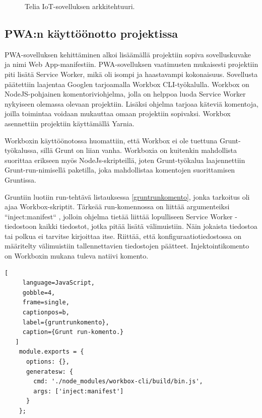 \documentclass{tktltiki}
\begin{document}
\begin{figure}[h]
\begin{center}
\caption{Telia IoT-sovelluksen arkkitehtuuri.}
\label{angulararkkitehtuuri}
\end{center}
\end{figure}


\subsection{PWA:n käyttöönotto projektissa}

PWA-sovelluksen kehittäminen alkoi lisäämällä projektiin sopiva sovelluskuvake ja nimi Web App-manifestiin. PWA-sovelluksen vaatimusten mukaisesti projektiin piti lisätä Service Worker, mikä oli isompi ja haastavampi kokonaisuus. Sovellusta päätettiin laajentaa Googlen tarjoamalla Workbox CLI-työkalulla. Workbox on NodeJS-pohjainen komentoriviohjelma, jolla on helppoa luoda Service Worker nykyiseen olemassa olevaan projektiin. Lisäksi ohjelma tarjoaa käteviä komentoja, joilla toimintaa voidaan mukauttaa omaan projektiin sopivaksi. Workbox asennettiin projektiin käyttämällä Yarnia.

Workboxin käyttöönotossa huomattiin, että Workbox ei ole tuettuna Grunt-työkalussa, sillä Grunt on liian vanha. Workboxia on kuitenkin mahdollista suorittaa erikseen myös NodeJs-skripteillä, joten Grunt-työkalua laajennettiin Grunt-run-nimisellä paketilla, joka mahdollistaa komentojen suorittamisen Gruntissa. 

Gruntiin luotiin run-tehtävä listauksessa \ref{gruntrunkomento}, jonka tarkoitus oli ajaa Workbox-skriptit. Tärkeää run-komennossa on liittää argumenteiksi “inject:manifest“ \cite{Googlec}, jolloin ohjelma tietää liittää lopulliseen Service Worker -tiedostoon kaikki tiedostot, jotka pitää lisätä välimuistiin. Näin jokaista tiedostoa tai polkua ei tarvitse kirjoittaa itse. Riittää, että konfiguraatiotiedostossa on määritelty välimuistiin tallennettavien tiedostojen päätteet. Injektointikomento on Workboxin mukana tuleva natiivi komento.

\begin{lstlisting}[
     language=JavaScript,
     gobble=4,
     frame=single,
     captionpos=b,
     label={gruntrunkomento},
     caption={Grunt run-komento.}
   ]
    module.exports = {
      options: {},
      generatesw: {
        cmd: './node_modules/workbox-cli/build/bin.js',
        args: ['inject:manifest']
      }
    };
\end{lstlisting}
\end{document}
